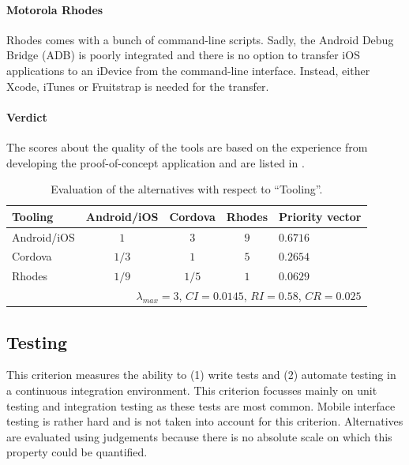 \paragraph{Motorola Rhodes} Rhodes comes with a bunch of command-line scripts. Sadly, the Android Debug Bridge (ADB) is poorly integrated  and there is no option to transfer iOS applications to an iDevice from the command-line interface. Instead, either Xcode, iTunes or Fruitstrap is needed for the transfer. 


\paragraph{Verdict} The scores about the quality of the tools are based on the experience from developing the proof-of-concept application and are listed in . 

\begin{table}[h!]
    \begin{center}
        \begin{tabular}{lcccl}
            \hline
            \textbf{Tooling} & Android/iOS & Cordova & Rhodes & Priority vector \\
            \hline
            Android/iOS      & $1$         & $3$     & $9$    & $0.6716$        \\
            Cordova          & $1/3$       & $1$     & $5$    & $0.2654$        \\
            Rhodes           & $1/9$       & $1/5$   & $1$    & $0.0629$        \\
            \hline
            \multicolumn{5}{r}{$\lambda_{max} = 3$, $CI = 0.0145$, $RI = 0.58$, $CR = 0.025$}\\
            \hline
        \end{tabular}
        \caption{Evaluation of the alternatives with respect to ``Tooling''.}
        \label{tab:tooling}
    \end{center}
\end{table}

\subsection{Testing}

This criterion measures the ability to (1) write tests and (2) automate testing in a continuous integration environment. This criterion focusses mainly on unit testing and integration testing as these tests are most common. Mobile interface testing is rather hard and is not taken into account for this criterion. Alternatives are evaluated using judgements because there is no absolute scale on which this property could be quantified. 

